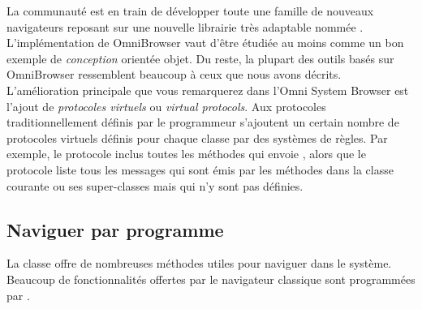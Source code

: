 \documentclass[a4paper,10pt,twoside]{book}
\begin{document}
La communaut\'e \sq est en train de d\'evelopper toute une famille de nouveaux
navigateurs reposant sur une nouvelle librairie tr\`es adaptable nomm\'ee
.  L'impl\'ementation de OmniBrowser vaut d'\^etre 
\'etudi\'ee au moins comme un bon exemple de \emph{conception} orient\'ee
objet. 
Du reste, la plupart des outils bas\'es sur OmniBrowser ressemblent beaucoup
\`a ceux que nous avons d\'ecrits.
L'am\'elioration principale que vous remarquerez dans l'Omni System Browser 
est l'ajout de \emph{protocoles virtuels} ou \emph{virtual protocols}.
Aux protocoles traditionnellement d\'efinis par le programmeur s'ajoutent
un certain nombre de protocoles virtuels d\'efinis pour chaque classe 
par des syst\`emes de r\`egles. 
Par exemple, le protocole  inclus toutes
les m\'ethodes qui envoie \super, alors que le protocole
  liste tous les messages qui sont \'emis
par les m\'ethodes dans la classe courante ou ses super-classes 
mais qui n'y sont pas d\'efinies.




\subsection{Naviguer par programme}

La classe  offre de nombreuses m\'ethodes utiles
pour naviguer dans le syst\`eme.
Beaucoup de fonctionnalit\'es offertes par le navigateur classique
sont programm\'ees par
.
\end{document}
